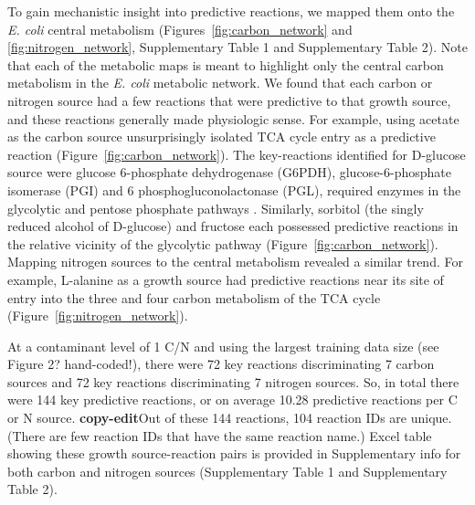 \documentclass[12pt]{article}
\begin{document}
To gain mechanistic insight into predictive reactions, we mapped them onto the \emph{E. coli} central metabolism (Figures~\ref{fig:carbon_network} and \ref{fig:nitrogen_network}, Supplementary Table 1 and Supplementary Table 2). Note that each of the metabolic maps is meant to highlight only the central carbon metabolism in the \emph{E. coli} metabolic network. We found that each carbon or nitrogen source had a few reactions that were predictive to that growth source, and these reactions generally made physiologic sense. For example, using acetate as the carbon source unsurprisingly isolated TCA cycle entry as a predictive reaction (Figure~\ref{fig:carbon_network}). The key-reactions identified for D-glucose source were glucose 6-phosphate dehydrogenase (G6PDH), glucose-6-phosphate isomerase (PGI) and 6 phosphogluconolactonase (PGL), required enzymes in the glycolytic and pentose phosphate pathways \cite{KuporFraenkel1972}. Similarly, sorbitol (the singly reduced alcohol of D-glucose) and fructose each possessed predictive reactions in the relative vicinity of the glycolytic pathway (Figure~\ref{fig:carbon_network}). Mapping nitrogen sources to the central metabolism revealed a similar trend. For example, L-alanine as a growth source had predictive reactions near its site of entry into the three and four carbon metabolism of the TCA cycle (Figure~\ref{fig:nitrogen_network}).

At a contaminant level of 1 C/N and using the largest training data size (see Figure {\color{red}2? hand-coded!}), there were 72 key reactions discriminating 7 carbon sources and 72 key reactions discriminating 7 nitrogen sources. So, in total there were 144 key predictive reactions, or on average 10.28 predictive reactions per C or N source. {\color{red}\textbf{copy-edit}Out of these 144 reactions, 104 reaction IDs are unique. (There are few reaction IDs that have the same reaction name.) Excel table showing these growth source-reaction pairs is provided in Supplementary info for both carbon and nitrogen sources (Supplementary Table 1 and Supplementary Table 2).}
\end{document}
